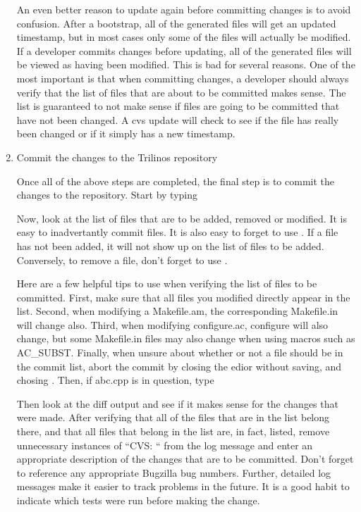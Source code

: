 \documentclass[12pt,strict]{TrilinosDevGuide}
\begin{document}
\begin{enumerate}
An even better reason to update again before committing changes is to avoid 
confusion.  After a bootstrap, all of the generated files will get an updated 
timestamp, but in most cases only some of the files will actually be 
modified.  If a developer commits changes before updating, all of the 
generated files will be viewed as having been modified.  This is bad for 
several reasons.  One of the most important is that when committing changes, a 
developer should always verify that the list of files that are about to be 
committed makes sense.  The list is guaranteed to not make sense if files are 
going to be committed that have not been changed.  A cvs update will check to 
see if the file has really been changed or if it simply has a new timestamp.

\item Commit the changes to the Trilinos repository

Once all of the above steps are completed, the final step is to commit the 
changes to the repository.  Start by typing


Now, look at the list of files that are to be added, removed  or modified.  
It is easy to inadvertantly commit files.  It is also easy to forget to use 
.  If a file has not been added, it will not show up on 
the list of files to be added.  Conversely, to remove a file, don't forget to 
use .  

Here are a few helpful tips to use when verifying the list of files 
to be committed.  First, make sure that all files you modified directly appear 
in the list.  Second, when modifying a Makefile.am, the corresponding 
Makefile.in will change also.  Third, when modifying configure.ac, configure 
will also change, but some Makefile.in files may also change when using macros 
such as AC\_SUBST.  Finally, when unsure about whether or not a 
file should be in the commit list, abort the commit by closing the edior 
without saving, and chosing .  Then, if abc.cpp is in 
question, type 


Then look at the diff output and see if it makes sense for the changes that 
were made.  After verifying that all of the files that are in the list belong 
there, and that all files that belong in the list are, in fact, listed, remove 
unnecessary instances of ``CVS: `` from the log message and enter an 
appropriate description of the changes that are to be committed.  Don't forget 
to reference any appropriate Bugzilla bug numbers.  Further, detailed log 
messages make it easier to track problems in the future.  It is a good habit 
to indicate which tests were run before making the change.


\end{enumerate}
\end{document}

